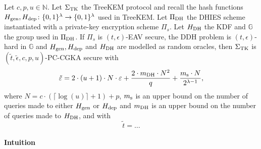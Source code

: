 \begin{theorem}
	Let $c, p, u \in \mathbb{N}$. Let $\Sigma_{\mathrm{TK}}$ the TreeKEM protocol and recall the hash functions $H_\mathrm{gen}, H_\mathrm{dep} \colon \{0, 1\}^\lambda \to \{0, 1\}^\lambda$ used in TreeKEM. Let $\Pi_{\mathrm{DH}}$ the DHIES scheme instantiated with a private-key encryption scheme $\Pi_s$. Let $H_\mathrm{DH}$ the KDF and $\mathbb{G}$ the group used in $\Pi_{\mathrm{DH}}$. If $\Pi_s$ is $(t, \epsilon)$-EAV secure, the DDH problem is $(t, \epsilon)$-hard in $\mathbb{G}$ and $H_\mathrm{gen}, H_\mathrm{dep}$ and $H_\mathrm{DH}$ are modelled as random oracles, then $\Sigma_{\mathrm{TK}}$ is $(\tilde{t}, \tilde{\epsilon}, c, p, u)$-PC-CGKA secure with
	\[
		\tilde{\varepsilon} = 2 \cdot (u + 1) \cdot N \cdot \varepsilon + \frac{2 \cdot m_\mathrm{DH} \cdot N^2}{q} + \frac{m_\mathrm{s} \cdot N}{2^{\lambda - 1}},
	\]
	where $N = c \cdot (\lceil \log(u) \rceil + 1) + p$, $m_\mathrm{s}$ is an upper bound on the number of queries made to either $H_\mathrm{gen}$ or $H_\mathrm{dep}$ and $m_\mathrm{DH}$ is an upper bound on the number of queries made to $H_\mathrm{DH}$, and with
	\[
		\tilde{t} = \ldots
	\]
\end{theorem}

\paragraph{Intuition} 
